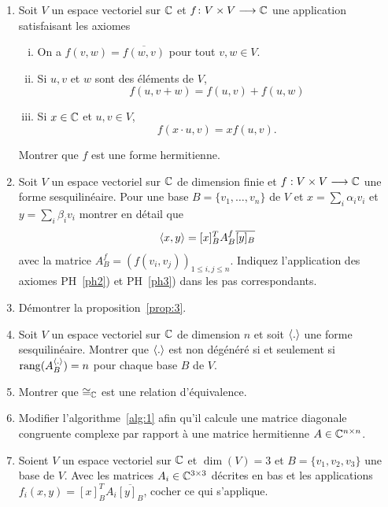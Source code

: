 \begin{enumerate}
\item Soit $V$ un espace vectoriel sur $\mathbb{C}$ et $f\colon V\times V \longrightarrow \mathbb{C}$ une application satisfaisant les axiomes 

  \begin{enumerate}[i)] 
  \item On a $f({v,w}) = \overline{f({w,v})}$ pour tout $v,w \in V$.  
  \item Si $u,v$ et $w$ sont des éléments de $V$,  
    \begin{displaymath}
      f({u,v+w}) = f({u,v}) +f({u,w}) 
    \end{displaymath}
  \item Si $x \in \mathbb{C}$ et $u,v \in V$, 
    \begin{displaymath}
      f({x \cdot u , v}) = x f({u,v}). 
    \end{displaymath}  
  \end{enumerate}
Montrer que $f$ est une forme hermitienne. 
\item Soit $V$ un espace vectoriel sur $\mathbb{C}$ de dimension finie et $f: V \times V \longrightarrow \mathbb{C}$ une forme sesquilinéaire. Pour une base  $B = \{v_1,\dots,v_n\}$ de $V$ et $x = \sum_i \alpha_i v_i$ et $y = \sum_i \beta_i v_i$ montrer en détail que 
  \begin{displaymath}
  \langle {x,y} \rangle = [x]_B ^T A_B^{f} \overline{[y]_B} 
\end{displaymath}
avec la matrice $A_B^f = (f(v_i,v_j))_{1 \leq i,j \leq n}$. Indiquez l'application des axiomes PH~\ref{ph2}) et PH~\ref{ph3}) dans les pas correspondants. 
\item Démontrer la proposition~\ref{prop:3}. 
\item Soit $V$ un espace vectoriel sur $\mathbb{C}$ de dimension $n$ et soit $\langle {.} \rangle$ une forme sesquilinéaire. Montrer que $\langle {.} \rangle$ est non dégénéré si et seulement si $\operatorname{rang}(A_B^{\langle {.} \rangle}) = n$  pour chaque base $B$ de $V$. 
\item Montrer que $\cong_{\mathbb{C}}$ est une relation d'équivalence. \label{item:6}
\item Modifier l'algorithme~\ref{alg:1} afin qu'il calcule une matrice diagonale congruente complexe par rapport à une matrice hermitienne $A \in \mathbb{C}^{n \times n}$. \label{item:7}
\item Soient $V$ un espace vectoriel sur $\mathbb{C}$ et $\dim(V) = 3$ et $B = \{v_1,v_2,v_3\}$ une base de $V$. Avec les matrices $A_i \in \mathbb{C}^{3\times 3}$ décrites en bas et les applications  $f_i(x,y) = [x]_B^T A_i \overline{[y]_B}$, cocher ce qui s'applique.  



\end{enumerate}
